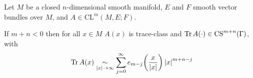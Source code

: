 \begin{theorem}
    Let $M$ be a closed $n$-dimensional smooth manifold, $E$ and $F$ smooth
    vector bundles over $M$, and $A\in\mathrm{CL}^m(M,E; F)$.

    If $m+n<0$ then for all $x\in M$ $A(x)$ is trace-class and $\operatorname{Tr} A(\cdot)\in
    \mathrm{CS}^{m+n}(\Gamma)$, with
    \begin{align*}
        \operatorname{Tr} A(x)\mathrel{\underset{\left|x\right|\to\infty}{\sim}}
        \sum_{j=0}^{\infty} e_{m-j}\!\left(\frac{x}{\left|x\right|}\right)
                            \left|x\right|^{m+n-j}
    \end{align*}
\end{theorem}
